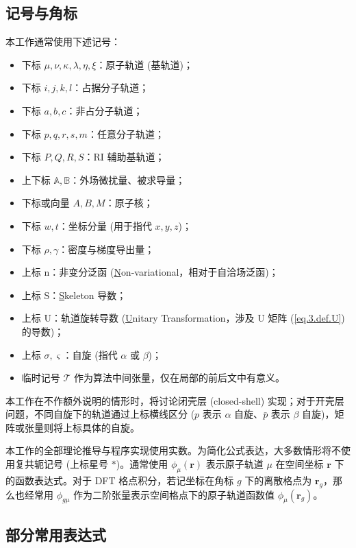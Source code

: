 \subsection{记号与角标}

本工作通常使用下述记号：
\begin{itemize}[nosep]
  \item 下标 $\mu, \nu, \kappa, \lambda, \eta, \xi$：原子轨道 (基轨道)；
  \item 下标 $i, j, k, l$：占据分子轨道；
  \item 下标 $a, b, c$：非占分子轨道；
  \item 下标 $p, q, r, s, m$：任意分子轨道；
  \item 下标 $P, Q, R, S$：RI 辅助基轨道；
  \item 上下标 $\mathbb{A}, \mathbb{B}$：外场微扰量、被求导量；
  \item 下标或向量 $A, B, M$：原子核；
  \item 下标 $w, t$：坐标分量 (用于指代 $x, y, z$)；
  \item 下标 $\rho, \gamma$：密度与梯度导出量；
  \item 上标 $\mathrm{n}$：非变分泛函 (\underline{N}on-variational，相对于自洽场泛函)；
  \item 上标 $\mathrm{S}$：\underline{S}keleton 导数；
  \item 上标 $\mathrm{U}$：轨道旋转导数 (\underline{U}nitary Transformation，涉及 U 矩阵 (\ref{eq.3.def.U}) 的导数)；
  \item 上标 $\sigma, \varsigma$：自旋 (指代 $\alpha$ 或 $\beta$)；
  \item 临时记号 $\mathscr{T}$ 作为算法中间张量，仅在局部的前后文中有意义。
\end{itemize}

本工作在不作额外说明的情形时，将讨论闭壳层 (closed-shell) 实现；对于开壳层问题，不同自旋下的轨道通过上标横线区分 ($p$ 表示 $\alpha$ 自旋、$\bar p$ 表示 $\beta$ 自旋)，矩阵或张量则将上标具体的自旋。

本工作的全部理论推导与程序实现使用实数。为简化公式表达，大多数情形将不使用复共轭记号 (上标星号 $*$)。通常使用 $\phi_\mu (\bm{r})$ 表示原子轨道 $\mu$ 在空间坐标 $\bm{r}$ 下的函数表达式。对于 DFT 格点积分，若记坐标在角标 $g$ 下的离散格点为 $\bm{r}_g$，那么也经常用 $\phi_{g \mu}$ 作为二阶张量表示空间格点下的原子轨道函数值 $\phi_\mu (\bm{r}_g)$。

\subsection{部分常用表达式}

